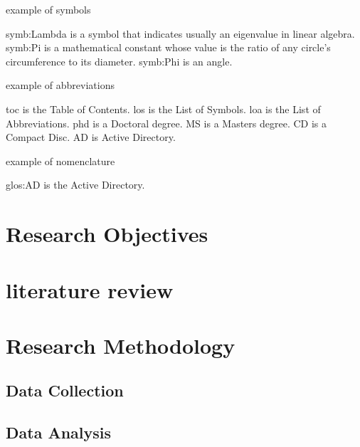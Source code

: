 example of symbols

\gls{symb:Lambda} is a symbol that indicates usually an eigenvalue in linear algebra. \gls{symb:Pi} is a mathematical constant whose value is the ratio of any circle's circumference to its diameter. \gls{symb:Phi} is an angle.

example of abbreviations

\gls{toc} is the Table of Contents. \gls{los} is the List of Symbols. \gls{loa} is the List of Abbreviations. \gls{phd} is a Doctoral degree. \gls{MS} is a Masters degree. \gls{CD} is a Compact Disc.  \gls{AD} is Active Directory.


example of nomenclature

\gls{glos:AD} is the Active Directory.

\section{Research Objectives}

\section{literature review}

\section{Research Methodology}

\subsection{Data Collection}

\subsection{Data Analysis}

